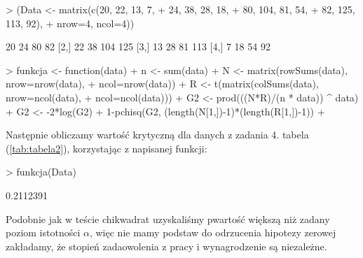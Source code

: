 \documentclass[12pt]{mwart}
\begin{document}
\begin{Schunk}
\begin{Sinput}
> (Data <- matrix(c(20, 22, 13, 7,
+ 		24, 38, 28, 18,
+ 		80, 104, 81, 54,
+ 		82, 125, 113, 92),
+ 	nrow=4, ncol=4))
\end{Sinput}
\begin{Soutput}
     [,1] [,2] [,3] [,4]
[1,]   20   24   80   82
[2,]   22   38  104  125
[3,]   13   28   81  113
[4,]    7   18   54   92
\end{Soutput}
\end{Schunk}


\begin{Schunk}
\begin{Sinput}
> funkcja <- function(data){
+ 	n <- sum(data)
+ 	N <- matrix(rowSums(data), nrow=nrow(data),
+ 			ncol=nrow(data))
+ 	R <- t(matrix(colSums(data), nrow=ncol(data),
+ 			ncol=ncol(data)))
+ 	G2 <- prod(((N*R)/(n * data)) ^ data)
+ 	G2 <- -2*log(G2)
+ 	1-pchisq(G2, (length(N[1,])-1)*(length(R[1,])-1))
+ }
\end{Sinput}
\end{Schunk}

Następnie obliczamy wartość krytyczną dla danych z zadania 4. \pauza tabela (\ref{tab:tabela2}), korzystając z napisanej funkcji:

\begin{Schunk}
\begin{Sinput}
> funkcja(Data)
\end{Sinput}
\begin{Soutput}
[1] 0.2112391
\end{Soutput}
\end{Schunk}

Podobnie jak w teście chi{\dywiz}kwadrat \ppauza uzyskaliśmy p{\dywiz}wartość większą niż zadany poziom istotności $\alpha$, więc nie mamy podstaw do odrzucenia hipotezy zerowej \pauza zakładamy, że stopień zadaowolenia z pracy i wynagrodzenie są niezależne.
\end{document}
